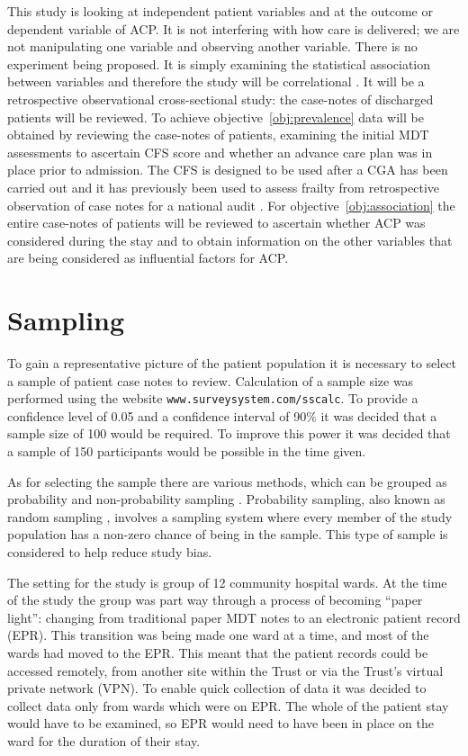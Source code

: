 \documentclass
[
	12pt,
	a4paper,
	oneside,
]{report}
\begin{document}
This study is looking at independent patient variables and at the outcome or
dependent variable 
of ACP. It is not interfering with how care is delivered; we are not 
manipulating one
variable and observing another variable. There is no experiment being proposed.
It is simply examining the statistical association between variables and
therefore the 
study will be correlational \parencite{field:09}. It will be a retrospective 
observational 
cross-sectional study: the case-notes of discharged patients will be reviewed.
To achieve objective~\ref{obj:prevalence} data will be obtained by reviewing 
the case-notes of patients, examining the initial MDT assessments to ascertain 
CFS score and whether an advance care plan was in place prior to admission. The
CFS is designed to be used after a CGA has been carried out \parencite{bgs:14}
and it has previously been used to assess frailty from retrospective observation 
of case notes for a national audit \parencite{subbe:13}. 
For objective~\ref{obj:association} the entire case-notes of patients 
will be reviewed to ascertain whether ACP was considered 
during the stay and to obtain information on the other variables that are
being considered as influential factors for ACP.

\section{Sampling}

To gain a representative picture of the patient population it is necessary
to select a sample of patient case notes to review. Calculation of a sample size 
was performed using the website \texttt{www.surveysystem.com/sscalc}. 
To provide a confidence
level of 0.05 and a confidence interval of 90\% it was decided that a sample 
size of 100 would be required. To improve this power it was decided that a sample
of 150 participants would be possible in the time given.

As for selecting the sample there are various methods, which can be grouped as 
probability and non-probability sampling \parencite{parahoo:14}. Probability 
sampling, also known as random sampling \parencite{biggam:15}, involves a 
sampling system where every
member of the study population has a non-zero chance of being in the sample.
This type of sample is considered to help reduce study bias.

The setting for the study is group of 12 
community hospital wards. At the time of the study the group was part way 
through a process of becoming ``paper light'': changing from traditional paper
MDT notes to an electronic patient record (EPR). This transition was being made
one ward at a time, and most of the wards had moved to the EPR. This meant that 
the patient records could be accessed remotely, from another site within the 
Trust or via the Trust's virtual private network (VPN). To enable quick 
collection of data it was decided to collect data only from wards which were on 
EPR. The whole of the patient stay would have to be examined, so EPR would need 
to have been in place on the ward for the duration of their stay.
\end{document}
